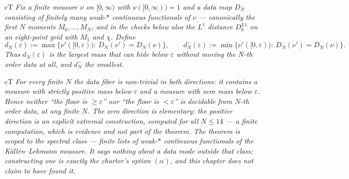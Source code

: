\begin{claimbox}{cT}
 \emph{Fix a finite measure $\nu$ on $[0,\infty)$ with
$\nu([0,\infty))=1$ and a data map $D_N$ consisting of finitely many weak-$*$ continuous
functionals of $\nu$ --- canonically the first $N$ moments $M_0,\ldots,M_N$, and in the checks below
also the $L^1$ distance $D_8^{L1}$ on an eight-point grid with $M_1$ and $\chi$. Define}
\[
  d_N(\varepsilon):=\max\bigl\{\nu'([0,\varepsilon)):\ D_N(\nu')=D_N(\nu)\bigr\},
  \qquad
  d_N^{-}(\varepsilon):=\min\bigl\{\nu'([0,\varepsilon)):\ D_N(\nu')=D_N(\nu)\bigr\}.
\]
\emph{Thus $d_N(\varepsilon)$ is the largest mass that can hide below $\varepsilon$ without moving
the $N$-th order data at all, and $d_N^{-}$ the smallest.}
\end{claimbox}

\begin{claimbox}{cT}
 \emph{For
every finite $N$ the data fiber is non-trivial in both directions: it contains a measure with
strictly positive mass below $\varepsilon$ and a measure with zero mass below $\varepsilon$. Hence
neither ``the floor is $\ge\varepsilon$'' nor ``the floor is $<\varepsilon$'' is decidable from
$N$-th order data, at any finite $N$. The zero direction is elementary; the positive direction is
an explicit extremal construction, computed for all $N\le14$ \LE{} --- a finite computation, which is
evidence and not part of the theorem. The theorem is scoped to the
\emph{spectral class} --- finite lists of weak-$*$ continuous functionals of the K\"all\'en--Lehmann
measure. It says nothing about a data mode outside that class; constructing one is exactly the
charter's option $(\alpha)$, and this chapter does not claim to have found it.}
\end{claimbox}

